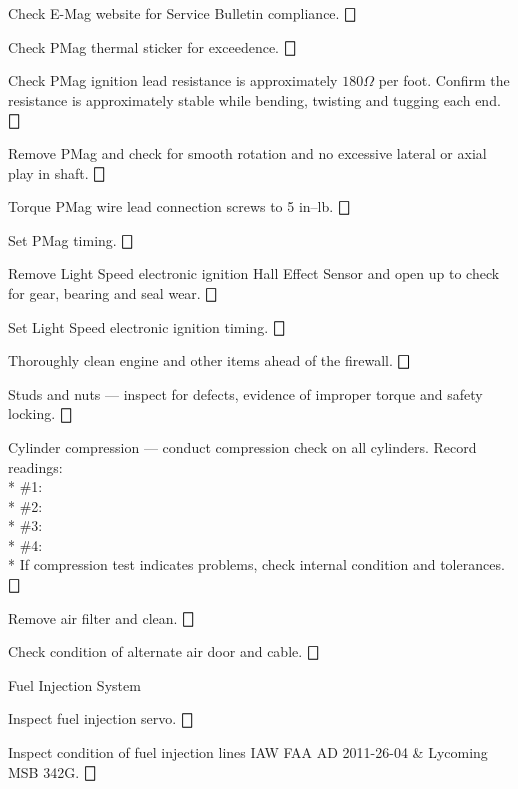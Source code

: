 \begin{enumerate*}
\begin{enumerate*}
\begin{enumerate*}
			{\item Check E-Mag website for Service Bulletin compliance. \dotfill $\bigbox$
			\item Check PMag thermal sticker for exceedence. \dotfill $\bigbox$
			\item Check PMag ignition lead resistance is approximately $180\Omega$ per foot.  Confirm the resistance is approximately stable while bending, twisting and tugging each end.  \dotfill $\bigbox$
			\item Remove PMag and check for smooth rotation and no excessive lateral or axial play in shaft. \dotfill $\bigbox$
			\item Torque PMag wire lead connection screws to 5 in--lb. \dotfill $\bigbox$
			\item Set PMag timing. \dotfill $\bigbox$}
			\item Remove Light Speed electronic ignition Hall Effect Sensor and open up to check for gear, bearing and seal wear. \dotfill $\bigbox$
			\item Set Light Speed electronic ignition timing. \dotfill $\bigbox$
		\end{enumerate*}
		\item Thoroughly clean engine and other items ahead of the firewall. \dotfill $\bigbox$
		\item Studs and nuts --- inspect for defects, evidence of improper torque and safety locking. \dotfill $\bigbox$
  	\item Cylinder compression --- conduct compression check on all cylinders. Record readings: \\* \hfill \#1:\underline{\makebox[0.5in][l]{}} \\* \hfill \#2:\underline{\makebox[0.5in][l]{}} \\* \hfill \#3:\underline{\makebox[0.5in][l]{}} \\* \hfill \#4:\underline{\makebox[0.5in][l]{}} \\* If compression test indicates problems, check internal condition and tolerances. \dotfill $\bigbox$
		\item Remove air filter and clean. \dotfill $\bigbox$
		\item Check condition of alternate air door and cable. \dotfill $\bigbox$
		\item Fuel Injection System
		\begin{enumerate*}
  		\item Inspect fuel injection servo. \dotfill $\bigbox$
  		\item Inspect condition of fuel injection lines IAW FAA AD 2011-26-04 \& Lycoming MSB 342G. \dotfill $\bigbox$

\end{enumerate*}
\end{enumerate*}
\end{enumerate*}
